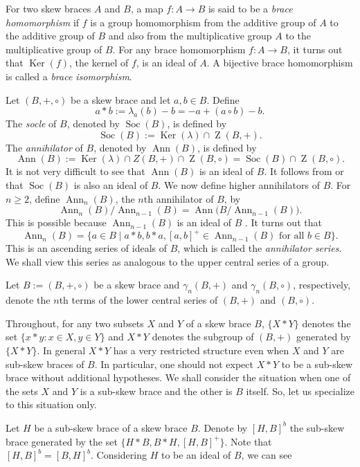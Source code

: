 \documentclass[11pt, oneside]{amsart}
\numberwithin{equation}{section}
\theoremstyle{plain}
\theoremstyle{definition}
\newcommand{\Z}{\operatorname{Z} }
\newcommand{\Ker}{\operatorname{Ker} }
\newcommand{\Soc}{\operatorname{Soc} }
\newcommand{\Ann}{\operatorname{Ann} }
\begin{document}
    
    
For two skew braces $A$ and $B$, a map $f : A \to B$ is said to be a {\it brace homomorphism} if $f$ is a group homomorphism from the additive group of $A$ to the additive group of $B$ and also from the multiplicative group $A$ to the multiplicative group of $B$. For any brace homomorphism $f : A \to B$, it turns out that $\Ker(f)$, the kernel of $f$,  is an ideal of $A$. A bijective brace homomorphism is called a {\it brace isomorphism}. 


Let $(B,+,\circ)$ be a skew brace and let $a,b\in B$. Define 
$$a \ast b := \lambda_a(b) - b = -a + (a \circ b) - b.$$
 The  {\it socle} of $B$,  denoted by $\Soc(B)$, is defined by 
 $$\Soc(B) := \Ker(\lambda) \cap \Z(B,+).$$
The  {\it annihilator} of $B$, denoted by $\Ann(B)$, is defined by 
 $$\Ann(B) := \Ker(\lambda) \cap Z(B,+) \cap \Z(B, \circ) = \Soc(B) \cap  \Z(B, \circ).$$
 It is not very difficult to see that  $\Ann(B)$  is an ideal of $B$. It  follows from \cite[Lemma 2.5]{GV17} or \cite[Proposition 2.9]{BEP24} that   $\Soc(B)$ is also an ideal of $B$. We now define higher annihilators of $B$. For $n \geqslant 2$, define $\Ann_n(B)$, the $n$th annihilator  of $B$, by
$$\Ann_n(B) / \Ann_{n-1}(B) = \Ann\big(B /  \Ann_{n-1}(B)\big).$$
This is possible because $\Ann_{n-1}(B)$ is an ideal of $B$ \cite[Definition 2.2]{JAV23}.  It turns out that 
$$\Ann_n(B) = \{a \in B \mid a*b, b*a,  [a, b]^{+}  \in \Ann_{n-1}(B) \mbox{ for all } b \in B\}.$$
This is an ascending series of ideals of $B$, which is called the  \textit{annihilator series}. We shall view this series as analogous to the upper central series of a group.

Let $B := (B, +, \circ)$ be a skew  brace and $\gamma_n(B, +)$ and  $\gamma_n(B, \circ)$, respectively, denote the $n$th terms of the lower central series of $(B, +)$ and $(B, \circ)$.  


Throughout, for any two subsets $X$ and $Y$ of a skew brace $B$, $\{X*Y\}$  denotes the set $\{x*y: x \in X, y\in Y\}$ and  $X * Y$ denotes the subgroup of $(B, +)$ generated by $\{X*Y\}$. In general $X * Y$ has a very restricted structure even when $X$ and $Y$ are sub-skew braces of $B$. In particular, one should not expect $X*Y$ to be a sub-skew brace without additional hypotheses. We shall consider the situation when  one of the sets $X$ and $Y$ is a sub-skew brace  and the other is $B$ itself. So, let us specialize to this situation only.
 
Let $H$ be a sub-skew brace of a skew brace $B$. Denote by $[H, B]^b$ the sub-skew brace generated by the set $\{ H*B, B*H, [H, B]^+\}$. Note that  $[H, B]^b = [B, H]^b$. Considering $H$ to be an ideal of $B$, we can see
 
\end{document}
